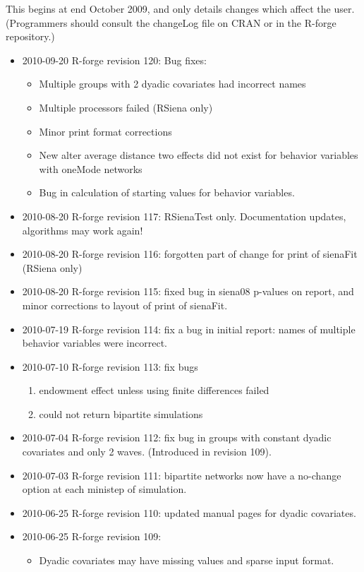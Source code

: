 \documentclass[a4paper,fleqn]{article}
\newcommand{\+}{\, + \,}
\begin{document}
{This begins at end October 2009, and only details changes which affect the user.
(Programmers should consult the changeLog file on CRAN or in the R-forge
repository.)
\begin{itemize}
\item 2010-09-20 R-forge revision 120: Bug fixes:
\begin{itemize}
\item Multiple groups with 2 dyadic covariates had incorrect names
\item Multiple processors failed (RSiena only)
\item Minor print format corrections
\item New alter average distance two effects did not exist for behavior
  variables with oneMode networks
\item Bug in calculation of starting values for behavior variables.
\end{itemize}
\item 2010-08-20 R-forge revision 117: RSienaTest only. Documentation updates,
algorithms may work again!
\item 2010-08-20 R-forge revision 116: forgotten
part of change for print of sienaFit (RSiena only)
\item 2010-08-20 R-forge revision 115: fixed bug in siena08 p-values on report,
and minor corrections to layout of print of sienaFit.
\item 2010-07-19 R-forge revision 114: fix a bug in initial report: names of
  multiple behavior variables were incorrect.
\item 2010-07-10 R-forge revision 113: fix bugs
\begin{enumerate}
\item endowment effect unless using finite differences failed
\item could not return bipartite simulations
\end{enumerate}
\item 2010-07-04 R-forge revision 112: fix bug in groups with constant dyadic
  covariates and only 2 waves. (Introduced in revision 109).
\item 2010-07-03 R-forge revision 111: bipartite networks now have a no-change
  option at each ministep of simulation.
\item 2010-06-25 R-forge revision 110: updated manual pages for dyadic
  covariates.
\item 2010-06-25 R-forge revision 109:
\begin{itemize}
\item Dyadic covariates may have missing values and sparse input format.

\end{itemize}
\end{itemize}}
\end{document}
